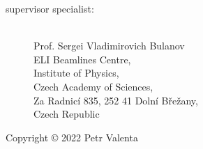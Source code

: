 \documentclass[10pt, a4paper, twoside, openright]{report}
\newcommand{\valenta}{Ing. Petr Valenta}
\newcommand{\bulanov}{Prof. Sergei Vladimirovich Bulanov}
\begin{document}
\begin{description}
	\item[supervisor specialist:]\ \\
	\bulanov \\
	ELI Beamlines Centre, \\
	Institute of Physics, \\
	Czech Academy of Sciences, \\
	Za Radnicí 835, 252 41 Dolní Břežany, \\
	Czech Republic
\end{description}
\vglue 1cm

\noindent Copyright {\copyright} {2022} {Petr Valenta}


%


%





\end{document}
